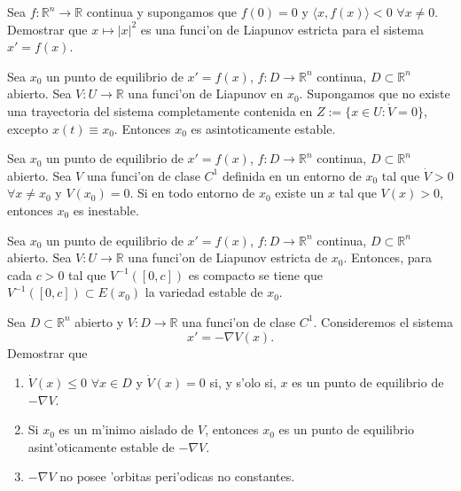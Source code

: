 \begin{ejercicio} Sea $f:\mathbb{R}^n\to\mathbb{R}$ continua y
supongamos que $f(0)=0$ y $\langle x,f(x)\rangle<0$ $\forall x\neq
0$. Demostrar que $x\mapsto |x|^2$ es una funci'on de Liapunov
estricta para el sistema $x'=f(x)$.

\end{ejercicio}

\begin{ejercicio}
Sea $x_0$ un punto de equilibrio de $x'=f(x)$,
$f:D\to\mathbb{R}^n$ continua, $D\subset\mathbb{R}^n$ abierto. Sea
$V:U\to\mathbb{R}$ una funci'on de Liapunov en $x_0$. Supongamos
que no existe una trayectoria del sistema completamente contenida
en $Z:=\{x\in U:\dot{V}=0\}$, excepto $x(t)\equiv x_0$. Entonces
$x_0$ es asintoticamente estable.

\end{ejercicio}


\begin{ejercicio}
Sea $x_0$ un punto de equilibrio de $x'=f(x)$,
 $f:D\to\mathbb{R}^n$ continua, $D\subset\mathbb{R}^n$ abierto.
 Sea $V$ una funci'on de clase $C^1$ definida en un entorno de
 $x_0$ tal que $\dot{V}>0$ $\forall x\neq x_0$ y $V(x_0)=0$. Si en
 todo entorno de $x_0$ existe un $x$ tal que $V(x)>0$, entonces
 $x_0$ es inestable.

\end{ejercicio}

\begin{ejercicio}
Sea $x_0$ un punto de equilibrio de $x'=f(x)$,
$f:D\to\mathbb{R}^n$ continua, $D\subset\mathbb{R}^n$ abierto. Sea
$V:U\to\mathbb{R}$ una funci'on de Liapunov estricta de $x_0$.
Entonces, para cada $c>0$ tal que $V^{-1}([0,c])$ es compacto se
tiene que $V^{-1}([0,c])\subset E(x_0)$ la variedad estable de
$x_0$.

\end{ejercicio}

\begin{ejercicio} Sea $D\subset\mathbb{R}^n$ abierto y
$V:D\to\mathbb{R}$ una funci'on de clase $C^1$. Consideremos el
sistema
\[
    x'=-\nabla V(x).
\]
Demostrar que
\begin{enumerate}
    \item   $\dot{V}(x)\leq 0$ $\forall x\in D$ y $\dot{V}(x)=0$
    si, y s'olo si, $x$ es un punto de equilibrio de $-\nabla
    V$.
    \item Si $x_0$ es un m'inimo aislado de $V$, entonces $x_0$ es
    un punto de equilibrio asint'oticamente estable de $-\nabla V$.
    \item $-\nabla V$ no posee 'orbitas peri'odicas no constantes.
\end{enumerate}
\end{ejercicio}

